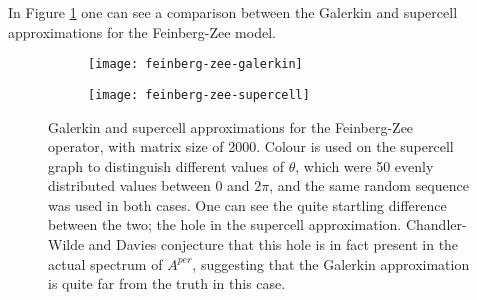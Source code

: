 \documentclass[../main.tex]{subfiles}
\begin{document}
In Figure \ref{fig:feinberg-zee} one can see a comparison between the Galerkin
and supercell approximations for the Feinberg-Zee model. 

\begin{figure}[p!]
\centering
\begin{subfigure}{0.4\textwidth}
  \texttt{[image: feinberg-zee-galerkin]}
  \end{subfigure} \begin{subfigure}{0.4\textwidth}
  \texttt{[image: feinberg-zee-supercell]} \end{subfigure}
  \caption{Galerkin and supercell approximations for the Feinberg-Zee operator,
	with matrix size of 2000. Colour is used on the supercell graph to
	distinguish different values of $\theta$, which were 50 evenly
	distributed values between $0$ and $2 \pi$, and the same random
	sequence was used in both cases. One can see the quite startling
	difference between the two; the hole in the supercell approximation.
	Chandler-Wilde and Davies \cite{chandler-wilde2012spectrum} conjecture
	that this hole is in fact present in the actual spectrum of $A^{per}$,
        suggesting that the Galerkin approximation is quite far from the truth
        in this case.}
\label{fig:feinberg-zee}
\end{figure}
\clearpage
\end{document}
